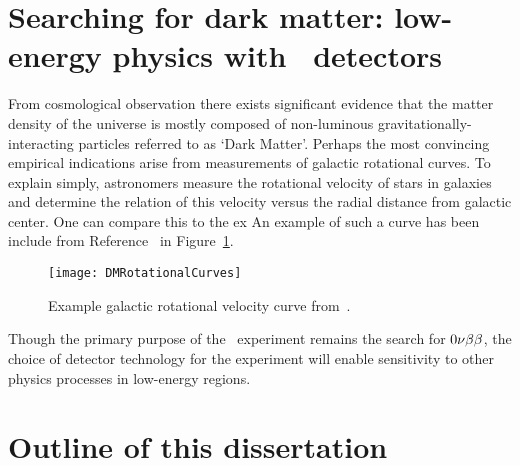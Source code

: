 

	\section{Searching for dark matter: low-energy physics with \ppc~detectors}
	
	
	From cosmological observation there exists significant evidence that the matter density of the universe is mostly composed of non-luminous gravitationally-interacting particles referred to as `Dark Matter'.  Perhaps the most convincing empirical indications arise from measurements of galactic rotational curves.  To explain simply, astronomers measure the rotational velocity of stars in galaxies and determine the relation of this velocity versus the radial distance from galactic center.  One can compare this to the ex
An example of such a curve has been include from Reference~\cite{Begeman:1991iy} in Figure~\ref{fig:DMRotCurve}.

		\begin{figure}
			\centering
			\texttt{[image: DMRotationalCurves]}
			\caption[Example galactic rotational velocity curve.]{Example galactic rotational velocity curve 
			from~\cite{Begeman:1991iy}.}
			\label{fig:DMRotCurve}
		\end{figure}
	
Though the primary purpose of the \MJ~experiment remains the search for $0 \nu \beta \beta$, the choice of detector technology for the experiment will enable sensitivity to other physics processes in low-energy regions.  

	
	\section{Outline of this dissertation}
